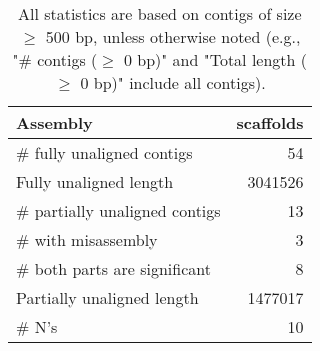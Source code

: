 \documentclass[12pt,a4paper]{article}
\begin{document}
\begin{table}[ht]
\begin{center}
\caption{All statistics are based on contigs of size $\geq$ 500 bp, unless otherwise noted (e.g., "\# contigs ($\geq$ 0 bp)" and "Total length ($\geq$ 0 bp)" include all contigs).}
\begin{tabular}{|l*{1}{|r}|}
\hline
Assembly & scaffolds \\ \hline
\# fully unaligned contigs & 54 \\ \hline
Fully unaligned length & 3041526 \\ \hline
\# partially unaligned contigs & 13 \\ \hline
\hspace{5mm}\# with misassembly & 3 \\ \hline
\hspace{5mm}\# both parts are significant & 8 \\ \hline
Partially unaligned length & 1477017 \\ \hline
\# N's & 10 \\ \hline
\end{tabular}
\end{center}
\end{table}
\end{document}
